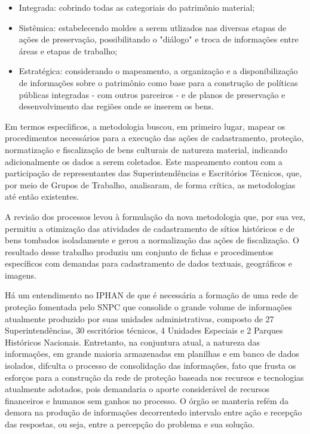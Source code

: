 \begin{itemize}
\item Integrada: cobrindo todas as categoriais do patrimônio material;
\item Sistêmica: estabelecendo moldes a serem utlizados nas diversas etapas de ações de preservação, possibilitando o "diálogo" e troca de informações entre áreas e etapas de trabalho;
\item Estratégica: considerando o mapeamento, a organização e a disponibilização de informações sobre o patrimônio como base para a construção de políticas públicas integradas - com outros parceiros - e de planos de preservação e desenvolvimento das regiões onde se inserem os bens.
\end{itemize}

Em termos especíificos, a metodologia buscou, em primeiro lugar, mapear os procedimentos necessários para a execução das ações de cadastramento, proteção, normatização e fiscalização de bens culturais de natureza material, indicando adicionalmente os dados a serem coletados. Este mapeamento contou com a participação de representantes das Superintendências e Escritórios Técnicos, que, por meio de Grupos de Trabalho, analisaram, de forma crítica, as metodologias até então existentes.

A revisão dos processos levou à formulação da nova metodologia que, por sua vez, permitiu a otimização das atividades de cadastramento de sítios históricos e de bens tombados isoladamente e gerou a normalização das ações de fiscalização. O resultado desse trabalho produziu um conjunto de fichas e procedimentos específicos com demandas para cadastramento de dados textuais, geográficos e imagens.

Há um entendimento no IPHAN de que é necessária a formação de uma rede de proteção fomentada pelo SNPC que consolide o grande volume de informações atualmente produzido por suas unidades administrativas, composto de 27 Superintendências, 30 escritórios técnicos, 4 Unidades Especiais e 2 Parques Históricos Nacionais. Entretanto, na conjuntura atual, a natureza das informações, em grande maioria armazenadas em planilhas e em banco de dados isolados, difculta o processo de consolidação das informações, fato que frusta os esforços para a construção da rede de proteção baseada nos recursos e tecnologias atualmente adotados, pois demandaria o aporte considerável de recursos financeiros e humanos sem ganhos no processo. O órgão se manteria refém da demora na produção de informações decorrentedo intervalo entre ação e recepção das respostas, ou seja, entre a percepção do problema e sua solução.

